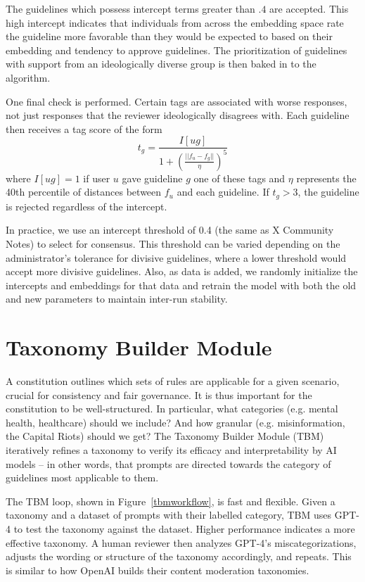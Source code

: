 \documentclass{article}
\begin{document}
\begin{multicols}{2}
The guidelines which possess intercept terms greater than $.4$ are accepted. This high intercept indicates that individuals from across the embedding space rate the guideline more favorable than they would be expected to based on their embedding and tendency to approve guidelines. The prioritization of guidelines with support from an ideologically diverse group is then baked in to the algorithm. 

One final check is performed. Certain tags are associated with worse responses, not just responses that the reviewer ideologically disagrees with. Each guideline then receives a tag score of the form 
$$t_g = \frac{I[ug]}{1 + \left(\frac{||f_u - f_g||}{\eta}\right)^5}$$
where $I[ug]=1$ if user $u$ gave guideline $g$ one of these tags and $\eta$ represents the 40th percentile of distances between $f_u$ and each guideline. If $t_g>3$, the guideline is rejected regardless of the intercept.

In practice, we use an intercept threshold of 0.4 (the same as X Community Notes) to select for consensus. This threshold can be varied depending on the administrator's tolerance for divisive guidelines, where a lower threshold would accept more divisive guidelines. Also, as data is added, we randomly initialize the intercepts and embeddings for that data and retrain the model with both the old and new parameters to maintain inter-run stability.

\section{Taxonomy Builder Module} \label{tbm}

A constitution outlines which sets of rules are applicable for a given scenario, crucial for consistency and fair governance. It is thus important for the constitution to be well-structured. In particular, what categories (e.g. mental health, healthcare) should we include? And how granular (e.g. misinformation, the Capital Riots) should we get? The Taxonomy Builder Module (TBM) iteratively refines a taxonomy to verify its efficacy and interpretability by AI models -- in other words, that prompts are directed towards the category of guidelines most applicable to them.

The TBM loop, shown in Figure~\ref{tbmworkflow}, is fast and flexible. Given a taxonomy and a dataset of prompts with their labelled category, TBM uses GPT-4 to test the taxonomy against the dataset. Higher performance indicates a more effective taxonomy. A human reviewer then analyzes GPT-4’s miscategorizations, adjusts the wording or structure of the taxonomy accordingly, and repeats. This is similar to how OpenAI builds their content moderation taxonomies. \cite{usinggpt4contentmod}


\end{multicols}
\end{document}

